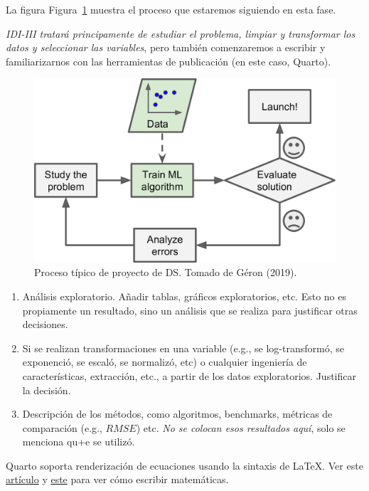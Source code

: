 \documentclass[
  letterpaper,
  DIV=11,
  numbers=noendperiod]{scrartcl}
\providecommand{\tightlist}{%
  \setlength{\itemsep}{0pt}\setlength{\parskip}{0pt}}\usepackage{longtable,booktabs,array}
\begin{document}
La figura Figura~\ref{fig-ml} muestra el proceso que estaremos siguiendo
en esta fase.

\emph{IDI-III tratará principamente de estudiar el problema, limpiar y
transformar los datos y seleccionar las variables}, pero también
comenzaremos a escribir y familiarizarnos con las herramientas de
publicación (en este caso, Quarto).

\begin{figure}[h]

{\centering \includegraphics{figs/ml_approach.png}

}

\caption{\label{fig-ml}Proceso típico de proyecto de DS. Tomado de Géron
(2019).}

\end{figure}

\begin{enumerate}
\def\labelenumi{\arabic{enumi}.}
\tightlist
\item
  Análisis exploratorio. Añadir tablas, gráficos exploratorios, etc.
  Esto no es propiamente un resultado, sino un análisis que se realiza
  para justificar otras decisiones.
\item
  Si se realizan transformaciones en una variable (e.g., se
  log-transformó, se exponenció, se escaló, se normalizó, etc) o
  cualquier ingeniería de características, extracción, etc., a partir de
  los datos exploratorios. Justificar la decisión.
\item
  Descripción de los métodos, como algoritmos, benchmarks, métricas de
  comparación (e.g., \(RMSE\)) etc. \emph{No se colocan esos resultados
  aquí}, solo se menciona qu+e se utilizó.
\end{enumerate}

Quarto soporta renderización de ecuaciones usando la sintaxis de \LaTeX.
Ver este
\href{https://quarto.org/docs/authoring/markdown-basics.html\#equations}{artículo}
y \href{https://qmd4sci.njtierney.com/math.html}{este} para ver cómo
escribir matemáticas.
\end{document}

